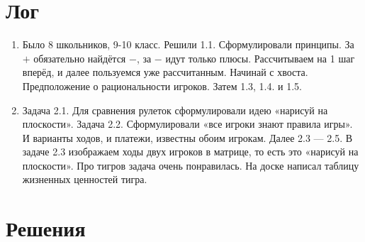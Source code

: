 \documentclass[12pt]{article}
\newcounter{problem}[section]
\begin{document}
\section{Лог}

\begin{enumerate}
  \item Было 8 школьников, 9-10 класс. Решили 1.1. Сформулировали принципы.
  За $+$ обязательно найдётся $-$, за $-$ идут только плюсы.
  Рассчитываем на 1 шаг вперёд, и далее пользуемся уже рассчитанным.
  Начинай с хвоста. Предположение о рациональности игроков.  Затем 1.3, 1.4. и 1.5.
  \item Задача 2.1. Для сравнения рулеток сформулировали идею «нарисуй на плоскости».
  Задача 2.2. Сформулировали «все игроки знают правила игры». И варианты
  ходов, и платежи, известны обоим игрокам. Далее 2.3 — 2.5.
  В задаче 2.3 изображаем ходы двух игроков в матрице, то есть это
  «нарисуй на плоскости». Про тигров задача очень понравилась. На доске написал
  таблицу жизненных ценностей тигра.
\end{enumerate}




\renewenvironment{solution}[1]{%
         \vskip .5cm plus 2cm minus 0.1cm%
         {\bfseries \hyperlink{problem:#1}{#1.}}%
}%
{%
}%

\section{Решения}

\end{document}
